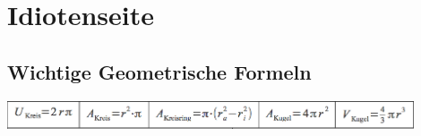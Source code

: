 \newcommand{\titleinfo}{Elektrizit\"atslehre 3 - Formelsammlung}
\newcommand{\authorinfo}{Braun\&Co., J\"urg, DIE Schwachstromelektriker, K\"orner,
						Gwerder}
\newcommand{\versioninfo}{$ Revision: 0.1 $ - $\omega = 2 \cdot \pi f$ | 
							gem\"ass Unterricht Josef Ebneter/HS2012 }
 
%


\usepackage{circuitikz}




\newpage

%
\newpage
\section{Idiotenseite}







\subsection{Wichtige Geometrische Formeln}
\includegraphics[width = 12cm]{./images/geom-formeln}
%




